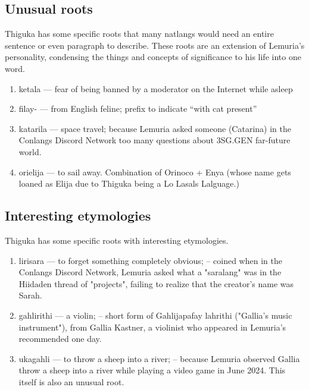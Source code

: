 \subsection{Unusual roots}
Thiguka has some specific roots that many natlangs would need an entire sentence or even paragraph to describe.
These roots are an extension of Lemuria's personality, condensing the things and concepts of significance to his life into one word.

\begin{multicols}{2} 
\begin{enumerate}
    \item ketala --- fear of being banned by a moderator on the Internet while asleep
    \item filay- --- from English feline; prefix to indicate ``with cat present''
    \item katarila --- space travel; because Lemuria asked someone (Catarina) in the Conlangs Discord Network too many questions about 3SG.GEN far-future world.
    \item orielija --- to sail away. Combination of Orinoco + Enya (whose name gets loaned as Elija due to Thiguka being a Lo Lasals Lalguage.)
\end{enumerate}
\end{multicols}

\subsection{Interesting etymologies}
Thiguka has some specific roots with interesting etymologies.

\begin{multicols}{2} 
    \begin{enumerate}
        \item lirisara --- to forget something completely obvious; -- coined when in the Conlangs Discord Network, Lemuria asked what a "saralang" was in the Hiidaden thread of "projects", failing to realize that the creator's name was Sarah.
        \item gahlirithi --- a violin; -- short form of Gahlijapafay lahrithi ("Gallia's music instrument"), from Gallia Kastner, a violinist who appeared in Lemuria's recommended one day.
        \item ukagahli --- to throw a sheep into a river; -- because Lemuria observed Gallia throw a sheep into a river while playing a video game in June 2024. This itself is also an unusual root.
    \end{enumerate}
\end{multicols}

